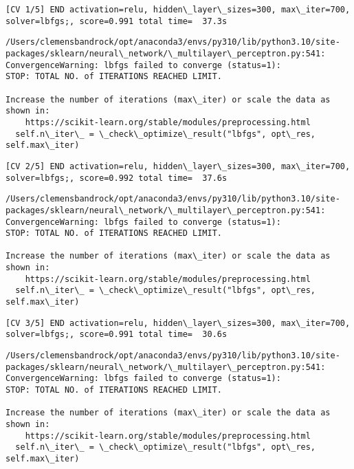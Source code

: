 \documentclass[11pt]{article}
\begin{document}
    \begin{Verbatim}[commandchars=\\\{\}]
[CV 1/5] END activation=relu, hidden\_layer\_sizes=300, max\_iter=700,
solver=lbfgs;, score=0.991 total time=  37.3s
    \end{Verbatim}

    \begin{Verbatim}[commandchars=\\\{\}]
/Users/clemensbandrock/opt/anaconda3/envs/py310/lib/python3.10/site-
packages/sklearn/neural\_network/\_multilayer\_perceptron.py:541:
ConvergenceWarning: lbfgs failed to converge (status=1):
STOP: TOTAL NO. of ITERATIONS REACHED LIMIT.

Increase the number of iterations (max\_iter) or scale the data as shown in:
    https://scikit-learn.org/stable/modules/preprocessing.html
  self.n\_iter\_ = \_check\_optimize\_result("lbfgs", opt\_res, self.max\_iter)
    \end{Verbatim}

    \begin{Verbatim}[commandchars=\\\{\}]
[CV 2/5] END activation=relu, hidden\_layer\_sizes=300, max\_iter=700,
solver=lbfgs;, score=0.992 total time=  37.6s
    \end{Verbatim}

    \begin{Verbatim}[commandchars=\\\{\}]
/Users/clemensbandrock/opt/anaconda3/envs/py310/lib/python3.10/site-
packages/sklearn/neural\_network/\_multilayer\_perceptron.py:541:
ConvergenceWarning: lbfgs failed to converge (status=1):
STOP: TOTAL NO. of ITERATIONS REACHED LIMIT.

Increase the number of iterations (max\_iter) or scale the data as shown in:
    https://scikit-learn.org/stable/modules/preprocessing.html
  self.n\_iter\_ = \_check\_optimize\_result("lbfgs", opt\_res, self.max\_iter)
    \end{Verbatim}

    \begin{Verbatim}[commandchars=\\\{\}]
[CV 3/5] END activation=relu, hidden\_layer\_sizes=300, max\_iter=700,
solver=lbfgs;, score=0.991 total time=  30.6s
    \end{Verbatim}

    \begin{Verbatim}[commandchars=\\\{\}]
/Users/clemensbandrock/opt/anaconda3/envs/py310/lib/python3.10/site-
packages/sklearn/neural\_network/\_multilayer\_perceptron.py:541:
ConvergenceWarning: lbfgs failed to converge (status=1):
STOP: TOTAL NO. of ITERATIONS REACHED LIMIT.

Increase the number of iterations (max\_iter) or scale the data as shown in:
    https://scikit-learn.org/stable/modules/preprocessing.html
  self.n\_iter\_ = \_check\_optimize\_result("lbfgs", opt\_res, self.max\_iter)
    \end{Verbatim}
\end{document}

